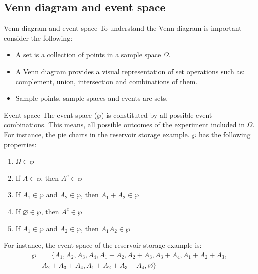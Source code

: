\documentclass[8pt]{beamer}
\renewcommand{\emph}[1]{\textcolor{myorange}{#1}}
\begin{document}
\subsection{Venn diagram and event space}
\begin{frame}{Venn diagram and event space}
    To understand the Venn diagram is important consider the following:
    \begin{itemize}
        \item A \emph{set} is a collection of points in a sample space $\Omega$.
        \item A Venn diagram provides a visual representation of set operations such as: complement, union, intersection and combinations of them. 
        \item Sample points, sample spaces and events are sets.
    \end{itemize}
    \begin{block}{Event space}
         The \emph{event space} ($\wp$) is constituted by all possible event combinations. This means, all possible outcomes of the experiment included in $\Omega$. For instance, the pie charts in the reservoir storage example. $\wp$ has the following properties:
         \begin{enumerate}
             \item $\Omega \in \wp$ 
             \item If $A \in \wp$, then $A^c \in \wp$ 
             \item If $A_1 \in \wp$ and $A_2 \in \wp$, then $A_1 + A_2 \in \wp$
             \item If $\varnothing \in \wp$, then $A^c \in \wp$
             \item If $A_1 \in \wp$ and $A_2 \in \wp$, then $A_1 A_2 \in \wp$
         \end{enumerate}
         For instance, the event space of the reservoir storage example is:
         $$
         \begin{aligned}
             \wp &= \{ A_1, A_2, A_3, A_4, A_1 + A_2, A_2 + A_3, A_3 + A_4, A_1 + A_2 + A_3, \\
                 & A_2 + A_3 + A_4, A_1 + A_2 + A_3 + A_4, \varnothing \}
         \end{aligned}
         $$
    \end{block}
\end{frame}
\end{document}
